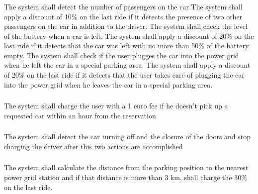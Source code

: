 \subsubsection{}
\begin{itemize}
	\reqcounter The system shall detect the number of passengers on the car
	\reqcounter The system shall apply a discount of 10\% on the last ride if it detects the presence of two other passengers on the car in addition to the driver.
	\reqcounter The system shall check the level of the battery when a car is left.
	\reqcounter The system shall apply a discount 	of 20\% on the last ride if it detects that the car was left with no more than 50\% of the battery empty.
	\reqcounter The system shall check if the user plugges the car into the power grid when he left the car in a special parking area.
	\reqcounter The system shall apply a discount 	of 20\% on the last ride if it detects that the user takes care of plugging the car into the power grid when he leaves the car in a special parking area. 
\end{itemize}

\subsubsection{}

\begin{itemize}
	\reqcounter The system shall charge the user with a 1 euro fee if he doesn't pick up a requested car within an hour from the reservation
	
\end{itemize}

\subsubsection{}


\subsubsection{}
\begin{itemize}
	\reqcounter The system shall detect the car turning off and the closure of the doors and stop charging the driver after this two actions are accomplished
	
\end{itemize}


\subsubsection{}
\begin{itemize}
	\reqcounter The system shall calculate the distance from the parking position to the nearest power grid station and if that distance is more than 3 km, shall charge the 30\% on the last ride. 
	
\end{itemize}


